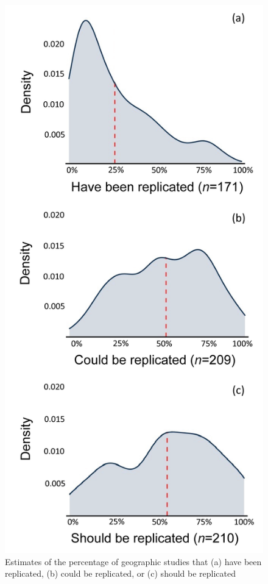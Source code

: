\documentclass[]{interact}
\theoremstyle{plain}%
\theoremstyle{definition}
\theoremstyle{remark}
\begin{document}
\begin{figure}[hbt!]
    \centering
    \includegraphics[scale=0.5]{results/figures/Fig-Q12-HCS.png}
    \caption{Estimates of the percentage of geographic studies that (a) have been replicated, (b) could be replicated, or (c) should be replicated}
    \label{fig:Q12-HCS}
\end{figure}
\end{document}
